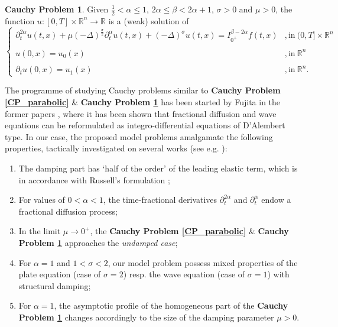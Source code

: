 \documentclass{amsart}
\theoremstyle{definition}
\newtheorem{problem}[theorem]{Cauchy Problem}
\theoremstyle{remark}
\numberwithin{equation}{section}
\newcommand{\BR}{{\mathbb R}}
\begin{document}
\begin{problem}\label{CP_hyperbolic}
	Given $\frac{1}{2}<\alpha\leq 1$, $2\alpha\leq\beta< 2\alpha+1$, $\sigma>0$ and $\mu>0$, the function $u:[0,T]\times \BR^n\rightarrow \BR$ is a (weak) solution of
	\begin{equation*}
		\begin{cases}
			\displaystyle 	\partial^{2\alpha}_t u(t,x)+\mu (-\Delta)^{\frac{\sigma}{2}}\partial^\alpha_t u(t,x)+(-\Delta)^\sigma u(t,x)=I^{\beta-2\alpha}_{0^+}f(t,x) &,\mbox{in}~(0,T] \times \mathbb{R}^n\\ \ \\
			u(0,x)=u_0(x)&,\mbox{in}~\mathbb{R}^n\\ \ \\
			\partial_t u(0,x)=u_1(x)&,\mbox{in}~\mathbb{R}^n.
		\end{cases}
	\end{equation*}
\end{problem}


The programme of studying Cauchy problems similar to {\bf Cauchy Problem \ref{CP_parabolic}} \& {\bf Cauchy Problem \ref{CP_hyperbolic}} has been started by Fujita in the former papers
\cite{Fujita90,FujitaII90}, where it has been shown that fractional diffusion and wave equations can be reformulated as integro-differential equations of D'Alembert type. In our case, the proposed model problems amalgamate the following properties, tactically investigated on several works (see e.g.  \cite{CCD08,DS15,PMR15,KSVZ16,KSZ17}):
\begin{enumerate}
	\item The damping part has ‘half of the order’ of the leading elastic term, which is in accordance with Russell's formulation \cite{Russell86};
	\item For values of $0<\alpha<1$, the time-fractional derivatives $\partial^{2\alpha}_t$ and $\partial^{\alpha}_t$ endow a fractional diffusion process;
	\item In the limit $\mu\rightarrow 0^+$, the {\bf Cauchy Problem \ref{CP_parabolic}} \& {\bf Cauchy Problem \ref{CP_hyperbolic}} approaches the {\it undamped case};
	\item For $\alpha=1$ and $1<\sigma<2$, our model problem possess mixed properties of
	the plate equation (case of $\sigma=2$) resp. the wave equation (case of $\sigma=1$) with structural damping;
	\item For $\alpha=1$, the asymptotic profile of the homogeneous part of the {\bf Cauchy Problem \ref{CP_hyperbolic}} changes accordingly to the size of the damping parameter $\mu>0$.
\end{enumerate}
\end{document}
